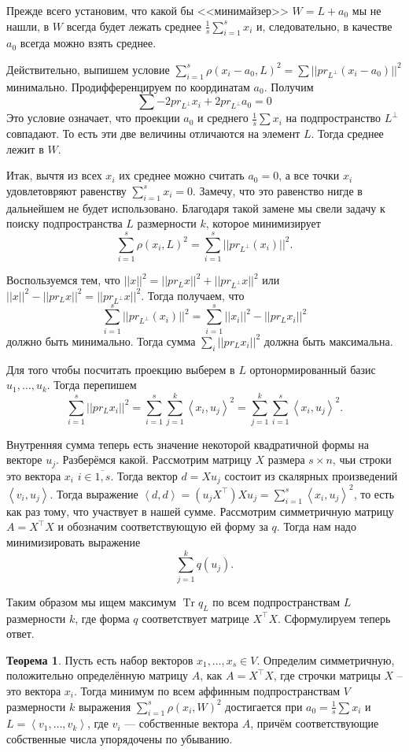 \documentclass[10pt,a4paper,oneside]{book}
\theoremstyle{definition}
\newtheorem{thm}{Теорема}
\newcommand{\ovl}{\overline}
\newcommand{\Tr}{\operatorname{Tr}}
\def\lan{\left\langle }
\def\ran{\right\rangle}
\def\thrm{\begin{thm}}
\def\ethrm{\end{thm}}
\begin{document}
Прежде всего установим, что какой бы <<минимайзер>> $W=L+a_0$ мы не нашли, в $W$ всегда будет лежать среднее $\frac{1}{s}\sum_{i=1}^s x_i$ и, следовательно, в качестве $a_0$ всегда можно взять среднее.

Действительно, выпишем условие $\sum_{i=1}^s \rho(x_i-a_0, L)^2=\sum ||pr_{L^{\bot}} (x_i-a_0)||^2$  минимально.  Продифференцируем по координатам $a_0$. Получим $$\sum -2pr_{L^{\bot}} x_i + 2 pr_{L^{\bot}} a_0=0$$
 Это условие означает, что проекции $a_0$ и среднего $\frac{1}{s}\sum x_i$ на подпространство $L^{\bot}$ совпадают. То есть эти две величины отличаются на элемент $L$. Тогда среднее лежит в $W$. 

Итак, вычтя из всех $x_i$ их среднее можно считать $a_0=0$, а все точки $x_i$ удовлетовряют равенству $\sum_{i=1}^s x_i=0$. Замечу, что это равенство нигде в дальнейшем не будет использовано. Благодаря такой замене мы свели задачу к поиску подпространства $L$ размерности $k$, которое минимизирует 
$$\sum_{i=1}^s \rho(x_i, L)^2=\sum_{i=1}^s ||pr_{L^{\bot}} (x_i)||^2.$$

Воспользуемся тем, что $||x||^2=||pr_L x||^2+||pr_{L^{\bot}} x||^2$ или $||x||^2-||pr_L x||^2=||pr_{L^{\bot}} x||^2$. Тогда получаем, что
$$\sum_{i=1}^s ||pr_{L^{\bot}}(x_i)||^2=\sum_{i=1}^s ||x_i||^2-||pr_L x_i||^2$$
должно быть минимально. Тогда сумма $\sum_i ||pr_L x_i||^2$ должна быть максимальна.


Для того чтобы посчитать проекцию выберем в $L$ ортонормированный базис $u_1,\dots,u_k$. Тогда перепишем
$$\sum_{i=1}^s ||pr_L x_i||^2=\sum_{i=1}^s\sum_{j=1}^k \lan x_i,u_j\ran^2=\sum_{j=1}^k \sum_{i=1}^s \lan x_i,u_j\ran^2.$$

Внутренняя сумма теперь есть значение некоторой квадратичной формы на векторе $u_j$. Разберёмся какой. Рассмотрим матрицу $X$ размера $s\times n$, чьи строки это  вектора $x_i$ $i\in\ovl{1,s}$. Тогда вектор $d=Xu_j$ состоит из скалярных произведений  $\lan v_i, u_j\ran$. Тогда выражение $\lan d,d\ran = (u_jX^{\top})Xu_j = \sum_{i=1}^s \lan x_i,u_j\ran^2$, то есть как раз тому, что участвует в нашей сумме. Рассмотрим симметричную матрицу $A=X^{\top}X$ и обозначим соответствующую ей форму за $q$. Тогда нам надо минимизировать выражение
$$\sum_{j=1}^k q(u_j).$$



Таким образом мы ищем максимум $\Tr q_{L}$ по всем подпространствам $L$ размерности $k$, где форма $q$ соответствует матрице $X^{\top} X$. 
Сформулируем теперь ответ. 


\thrm  Пусть есть набор векторов $x_1,\dots,x_s \in V$. Определим симметричную, положительно определённую матрицу $A$, как $A=X^{\top}X$, где строчки матрицы $X$ -- это вектора $x_i$. Тогда минимум по всем аффинным подпространствам $V$ размерности $k$ выражения $\sum_{i=1}^s \rho(x_i,W)^2$ достигается при $a_0=\frac{1}{s}\sum x_i$  и $L=\lan v_1,\dots,v_k\ran$, где $v_i$ --- собственные вектора $A$, причём соответствующие собственные числа упорядочены по убыванию. 
\ethrm
\end{document}
